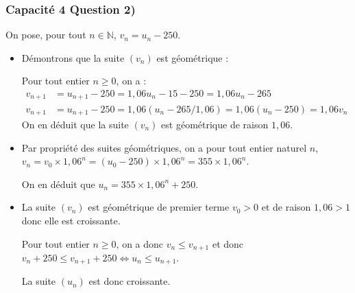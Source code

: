 \documentclass[11pt, hyperref={urlcolor=red,%
            linkcolor=blue, %
            colorlinks=true}]{beamer}
\newcommand{\N}{\mathbb{N}}
\newcommand{\suite}[1]{\ensuremath{\left(#1_{n}\right)}}
\begin{document}
\begin{frame}
\frametitle{Capacité 4 Question 2)}

On pose, pour tout $n\in \N$, $v_n=u_n-250$.



\begin{itemize}
\pause \item Démontrons que la suite $\suite{v}$ est géométrique :


Pour tout entier $n \geqslant 0$, on a :
\begin{align*}
v_{n+1}&=u_{n+1}-250=1,06u_{n}-15-250=1,06u_{n}-265\\
v_{n+1}&=u_{n+1}-250=1,06(u_{n}-265/1,06)=1,06(u_{n}-250)=1,06v_{n}
\end{align*}
On en déduit que la suite $\suite{v}$ est géométrique de raison $1,06$.
\pause \item Par propriété des suites géométriques, on a pour tout entier naturel $n$, $v_{n}=v_{0}\times 1,06^{n}=(u_{0}-250)\times 1,06^{n}=355\times 1,06^{n}$.

On en déduit que $u_n=355\times 1,06^{n}+250$.

\pause \item La suite $\suite{v}$ est géométrique de premier terme $v_{0}>0$ et de raison $1,06>1$ donc elle est croissante. 

Pour tout entier $n \geqslant 0$, on a donc $v_{n}\leqslant v_{n+1}$ et donc $v_{n}+250\leqslant v_{n+1}+250 \Leftrightarrow u_{n} \leqslant u_{n+1}$.

La suite $\suite{u}$ est donc croissante.






\end{itemize}

\end{frame}
\end{document}

